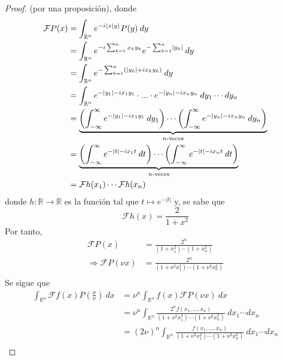 \documentclass[12pt]{report}
\newcounter{it}
\theoremstyle{largebreak}
\newcommand\abs[1]{\ensuremath{\left|#1\right|}}
\newcommand\cf[3]{\ensuremath{#1:#2\rightarrow#3}}
\newcommand\pint[2]{\ensuremath{\langle#1| #2\rangle}}
\newcommand{\fou}[1]{\ensuremath{\mathcal{F}#1}}
\begin{document}
\begin{proof}
        (por una proposición), donde
        \begin{equation*}
            \begin{split}
                \fou{P}(x)&=\int_{\mathbb{R}^n}e^{-i\pint{x}{y}}P(y)\:dy\\
                &=\int_{\mathbb{R}^n}e^{-i\sum_{ k=1}^n x_ky_k}e^{ -\sum_{ k=1}^n \abs{y_k}}\:dy\\
                &=\int_{\mathbb{R}^n}e^{-\sum_{ k=1}^n(\abs{y_k}+ix_ky_k)}\:dy\\
                &=\int_{\mathbb{R}^n}e^{-\abs{y_1}-ix_1y_1}\cdot...\cdot e^{-\abs{y_n}-ix_ny_n}\:dy_1\cdots dy_n\\
                &=\underbrace{\left(\int_{-\infty}^{\infty}e^{-\abs{y_1}-ix_1y_1}\:dy_1 \right)\cdots\left(\int_{-\infty}^{\infty}e^{-\abs{y_n}-ix_ny_n}\:dy_n \right)}_{ n\textup{-veces}}\\
                &=\underbrace{\left(\int_{-\infty}^{\infty}e^{-\abs{t}-ix_1t}\:dt \right)\cdots\left(\int_{-\infty}^{\infty}e^{-\abs{t}-ix_nt}\:dt \right)}_{ n\textup{-veces}}\\
                &=\fou{h}(x_1)\cdots\fou{h}(x_n)\\
            \end{split}
        \end{equation*}
        donde $\cf{h}{\mathbb{R}}{\mathbb{R}}$ es la función tal que $t\mapsto e^{-\abs{t}}$ y, se sabe que
        \begin{equation*}
            \fou{h}(x)=\frac{2}{1+x^2}
        \end{equation*}
        Por tanto,
        \begin{equation*}
            \begin{split}
                \fou{P}(x)&=\frac{2^n}{(1+x_1^2)\cdots(1+x_n^2)}\\
                \Rightarrow \fou{P}(\nu x)&=\frac{2^n}{(1+\nu^2x_1^2)\cdots(1+\nu^2x_n^2)}\\
            \end{split}
        \end{equation*}
        Se sigue que
        \begin{equation*}
            \begin{split}
                \int_{\mathbb{R}^n}\fou{f}(x)P\left(\frac{x}{\nu}\right)\:dx&=\nu^n\int_{\mathbb{R}^n}f(x)\fou{P}(\nu x)\:dx\\
                &=\nu^n\int_{\mathbb{R}^n}\frac{2^nf(x_1,...,x_n)}{(1+\nu^2x_1^2)\cdots(1+\nu^2x_n^2)}\:dx_1\cdots dx_n\\
                &=(2\nu)^n\int_{\mathbb{R}^n}\frac{f(x_1,...,x_n)}{(1+\nu^2x_1^2)\cdots(1+\nu^2x_n^2)}\:dx_1\cdots dx_n\\
            \end{split}
        \end{equation*}


\end{proof}
\end{document}
